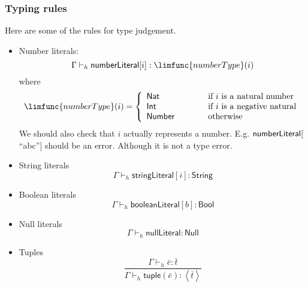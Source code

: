 \documentclass[12pt]{article}
\begin{document}
\subsubsection{Typing rules}

Here are some of the rules for type judgement.

\begin{itemize}
\item Number literals:$\ $%
\begin{equation*}
\Gamma \vdash _{h}\mathsf{numberLiteral}[i]:\limfunc{numberType}(i)
\end{equation*}%
where%
\begin{equation*}
\limfunc{numberType}(i)=\left\{ 
\begin{array}{lll}
\mathsf{Nat} & \qquad & \text{if }i\text{ is a natural number} \\ 
\mathsf{Int} &  & \text{if }i\text{ is a negative natural} \\ 
\mathsf{Number} &  & \text{otherwise}%
\end{array}%
\right.
\end{equation*}%
We should also check that $i$ actually represents a number. E.g. $\mathsf{%
numberLiteral}[$\textquotedblleft abc\textquotedblright $]$ should be an
error. Although it is not a type error.

\item String literals 
\begin{equation*}
\Gamma \vdash _{h}\mathsf{stringLiteral}[i]:\mathsf{String}
\end{equation*}

\item Boolean literals 
\begin{equation*}
\Gamma \vdash _{h}\mathsf{booleanLiteral}[b]:\mathsf{Bool}
\end{equation*}

\item Null literals%
\begin{equation*}
\Gamma \vdash _{h}\mathsf{nullLiteral}:\mathsf{Null}
\end{equation*}

\item Tuples%
\begin{equation*}
\frac{\Gamma \vdash _{h}\bar{e}:\bar{t}}{\Gamma \vdash _{h}\mathsf{tuple}%
\left( \bar{e}\right) :\left\langle \bar{t}\right\rangle }
\end{equation*}


\end{itemize}
\end{document}
